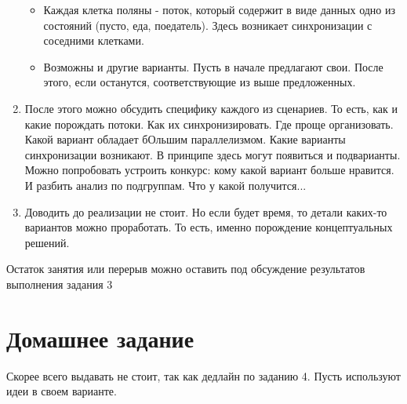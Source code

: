 \begin{enumerate}
\begin{itemize}
            \item Каждая клетка поляны - поток, который содержит в виде данных одно из состояний (пусто, еда, поедатель). Здесь возникает синхронизации с соседними клетками.
            \item Возможны и другие варианты. Пусть в начале предлагают свои. После этого, если останутся, соответствующие из выше предложенных.
        \end{itemize}
    \item После этого можно обсудить специфику каждого из сценариев. То есть, как и какие порождать потоки. Как их синхронизировать. Где проще организовать. Какой вариант обладает бОльшим параллелизмом. Какие варианты синхронизации возникают. В принципе здесь могут появиться и подварианты. Можно попробовать устроить конкурс: кому какой вариант больше нравится. И разбить анализ по подгруппам. Что у какой получится...
    \item Доводить до реализации не стоит. Но если будет время, то детали каких-то вариантов можно проработать. То есть, именно порождение концептуальных решений.
\end{enumerate}

Остаток занятия или перерыв можно оставить под обсуждение результатов выполнения задания 3

\section{Домашнее задание}

Скорее всего выдавать не стоит, так как дедлайн по заданию 4. Пусть используют идеи в своем варианте.

